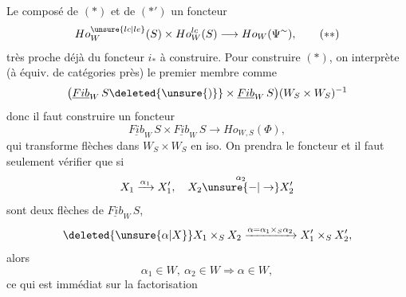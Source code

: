 
Le composé de $(*)$ et de $(*')$   un foncteur
\[
 Ho^{\unsure{lc|le}}_W(S)\times Ho^{lc}_W(S)\longrightarrow Ho_W(\Psi^{\sim}),
 \tag*{$(**)$}
\]
très proche déjà du foncteur $i_*$ à construire. Pour construire $(*)$, on interprète (à équiv. de catégories près) le premier membre comme
\[
 \bigl(\underline{Fib}_W\,S\deleted{\unsure{)}}\times
 \underline{Fib}_W\,S\bigr)(W_S\times W_S)^{-1}
\]
donc il faut construire un foncteur
\[
 \underline{Fib}_W\,S\times\underline{Fib}_W\,S\longrightarrow Ho_{W,S}(\Phi),
\]
qui transforme flèches dans $W_S\times W_S$ en iso. On prendra le foncteur
et il faut seulement vérifier que si
\[
 X_1\xrightarrow{\alpha_1}X'_1,\quad X_2\overset{\alpha_2}{\unsure{-|\to}}X'_2
\]
sont deux flèches de $\underline{Fib}_W\,S$, 
\[
 \deleted{\unsure{\alpha|X}}X_1\times_S X_2\xrightarrow{\alpha=\alpha_1\times_S\alpha_2}X'_1\times_S X'_2,
\]
alors
\[
 \alpha_1\in W,\ \alpha_2\in W\Longrightarrow\alpha\in W,
\]
ce qui est immédiat sur la factorisation

